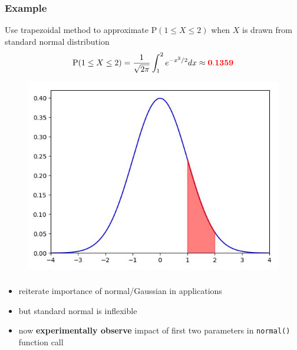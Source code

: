 \documentclass[english,14pt]{beamer}
\newcommand\red[1]{{\color{red} #1}}
\begin{document}
%
%
%
%


\begin{frame}[fragile]

\frametitle{Example}

Use trapezoidal method to approximate $\mathrm{P}(1 \leq X \leq 2)$ when $X$ is drawn from standard normal distribution
\[
\mathrm{P}(1 \leq X \leq 2) = \frac{1}{\sqrt{2\pi}} \int_1^2 e^{-x^2/2} dx \approx \mathbf{\red{0.1359}}
\]

\vspace*{-5mm}
\begin{figure}[ht]
	\centering
	\includegraphics[width=.5\textwidth]{figures/stdnormal_12}
\end{figure}

\end{frame}


\begin{frame}[fragile]

\frametitle{}

\begin{itemize}
	\item reiterate importance of normal/Gaussian in applications
	\item but standard normal is inflexible
	\item now \textbf{experimentally observe} impact of first two parameters in \texttt{normal()} function call
\end{itemize}

\end{frame}
\end{document}
